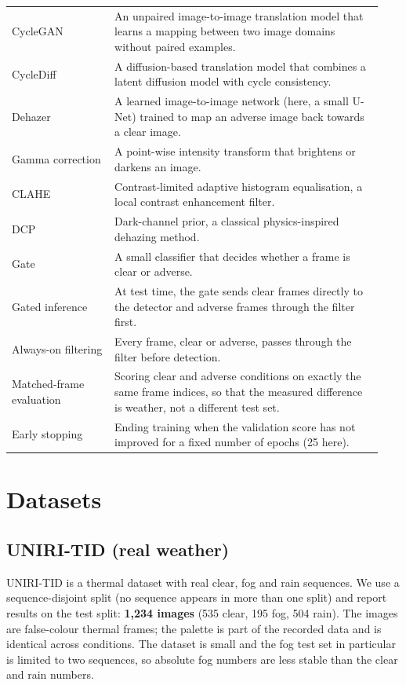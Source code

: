 \documentclass[11pt,a4paper]{article}
\begin{document}
\begin{table}[H]
\begin{tabular}{@{}p{0.26\linewidth}p{0.68\linewidth}@{}}
CycleGAN & An unpaired image-to-image translation model that learns a mapping between two image domains without paired examples. \\
CycleDiff & A diffusion-based translation model that combines a latent diffusion model with cycle consistency. \\
Dehazer & A learned image-to-image network (here, a small U-Net) trained to map an adverse image back towards a clear image. \\
Gamma correction & A point-wise intensity transform that brightens or darkens an image. \\
CLAHE & Contrast-limited adaptive histogram equalisation, a local contrast enhancement filter. \\
DCP & Dark-channel prior, a classical physics-inspired dehazing method. \\
Gate & A small classifier that decides whether a frame is clear or adverse. \\
Gated inference & At test time, the gate sends clear frames directly to the detector and adverse frames through the filter first. \\
Always-on filtering & Every frame, clear or adverse, passes through the filter before detection. \\
Matched-frame evaluation & Scoring clear and adverse conditions on exactly the same frame indices, so that the measured difference is weather, not a different test set. \\
Early stopping & Ending training when the validation score has not improved for a fixed number of epochs (25 here). \\
\bottomrule
\end{tabular}
\end{table}

\section{Datasets}

\subsection{UNIRI-TID (real weather)}
UNIRI-TID\cite{uniri} is a thermal dataset with real clear, fog and rain sequences. We use a
sequence-disjoint split (no sequence appears in more than one split) and report
results on the test split: \textbf{1,234 images} (535 clear, 195 fog, 504 rain).
The images are false-colour thermal frames; the palette is part of the recorded
data and is identical across conditions. The dataset is small and the fog test
set in particular is limited to two sequences, so absolute fog numbers are less
stable than the clear and rain numbers.
\end{document}
